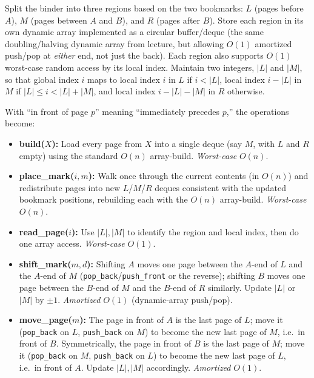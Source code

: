 \documentclass[12pt,twoside]{article}
\begin{document}
\begin{problems}
\newpage
\problem  %

Split the binder into three regions based on the two bookmarks: $L$ (pages before $A$),
$M$ (pages between $A$ and $B$), and $R$ (pages after $B$). Store each region in its own
dynamic array implemented as a circular buffer/deque (the same doubling/halving dynamic
array from lecture, but allowing $O(1)$ amortized push/pop at \emph{either} end, not just the
back). Each region also supports $O(1)$ worst-case random access by its local index. Maintain
two integers, $|L|$ and $|M|$, so that global index $i$ maps to local index $i$ in $L$ if
$i < |L|$, local index $i - |L|$ in $M$ if $|L| \le i < |L|+|M|$, and local index
$i - |L| - |M|$ in $R$ otherwise.

With ``in front of page $p$'' meaning ``immediately precedes $p$,'' the operations become:

\begin{itemize}
\item \textbf{build($X$):} Load every page from $X$ into a single deque (say $M$, with
$L$ and $R$ empty) using the standard $O(n)$ array-build. \emph{Worst-case} $O(n)$.

\item \textbf{place\_mark($i,m$):} Walk once through the current contents (in $O(n)$) and
redistribute pages into new $L$/$M$/$R$ deques consistent with the updated bookmark
positions, rebuilding each with the $O(n)$ array-build. \emph{Worst-case} $O(n)$.

\item \textbf{read\_page($i$):} Use $|L|,|M|$ to identify the region and local index, then do
one array access. \emph{Worst-case} $O(1)$.

\item \textbf{shift\_mark($m,d$):} Shifting $A$ moves one page between the $A$-end of $L$ and
the $A$-end of $M$ (\texttt{pop\_back}/\texttt{push\_front} or the reverse); shifting $B$
moves one page between the $B$-end of $M$ and the $B$-end of $R$ similarly. Update $|L|$ or
$|M|$ by $\pm 1$. \emph{Amortized} $O(1)$ (dynamic-array push/pop).

\item \textbf{move\_page($m$):} The page in front of $A$ is the last page of $L$; move it
(\texttt{pop\_back} on $L$, \texttt{push\_back} on $M$) to become the new last page of $M$,
i.e.\ in front of $B$. Symmetrically, the page in front of $B$ is the last page of $M$; move
it (\texttt{pop\_back} on $M$, \texttt{push\_back} on $L$) to become the new last page of $L$,
i.e.\ in front of $A$. Update $|L|,|M|$ accordingly. \emph{Amortized} $O(1)$.
\end{itemize}


\end{problems}
\end{document}
